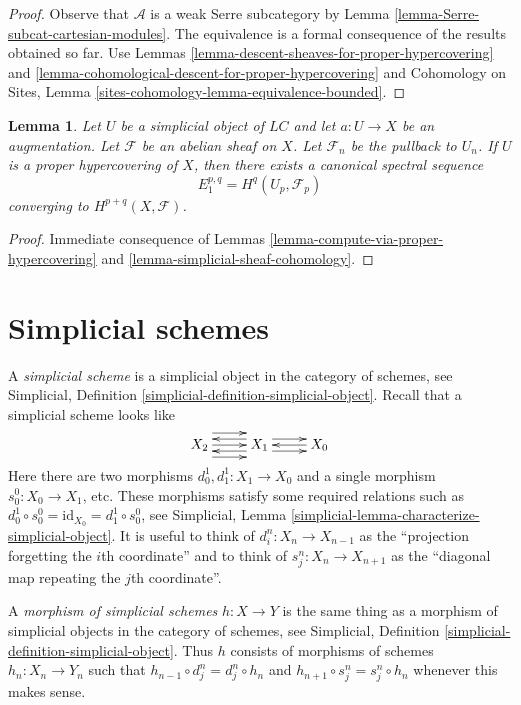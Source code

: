 \documentclass{stacks-project}
\theoremstyle{plain}
\newtheorem{lemma}[subsection]{Lemma}
\theoremstyle{definition}
\theoremstyle{remark}
\numberwithin{equation}{subsection}
\begin{document}
\begin{proof}
Observe that $\mathcal{A}$ is a weak Serre subcategory by
Lemma \ref{lemma-Serre-subcat-cartesian-modules}.
The equivalence is a
formal consequence of the results obtained so far. Use
Lemmas \ref{lemma-descent-sheaves-for-proper-hypercovering} and
\ref{lemma-cohomological-descent-for-proper-hypercovering} and
Cohomology on Sites, Lemma \ref{sites-cohomology-lemma-equivalence-bounded}.
\end{proof}

\begin{lemma}
\label{lemma-spectral-sequence-proper-hypercovering}
Let $U$ be a simplicial object of $\textit{LC}$ and let
$a : U \to X$ be an augmentation. Let $\mathcal{F}$ be an abelian sheaf
on $X$. Let $\mathcal{F}_n$ be the pullback to $U_n$.
If $U$ is a proper hypercovering of $X$, then
there exists a canonical spectral sequence
$$
E_1^{p, q} = H^q(U_p, \mathcal{F}_p)
$$
converging to $H^{p + q}(X, \mathcal{F})$.
\end{lemma}

\begin{proof}
Immediate consequence of Lemmas \ref{lemma-compute-via-proper-hypercovering}
and \ref{lemma-simplicial-sheaf-cohomology}.
\end{proof}




\section{Simplicial schemes}
\label{section-simplicial}

\noindent
A {\it simplicial scheme} is a simplicial object in the category of schemes,
see Simplicial, Definition \ref{simplicial-definition-simplicial-object}.
Recall that a simplicial scheme looks like
$$
\xymatrix{
X_2
\ar@<2ex>[r]
\ar@<0ex>[r]
\ar@<-2ex>[r]
&
X_1
\ar@<1ex>[r]
\ar@<-1ex>[r]
\ar@<1ex>[l]
\ar@<-1ex>[l]
&
X_0
\ar@<0ex>[l]
}
$$
Here there are two morphisms $d^1_0, d^1_1 : X_1 \to X_0$
and a single morphism $s^0_0 : X_0 \to X_1$, etc.
These morphisms satisfy some required relations such as
$d^1_0 \circ s^0_0 = \text{id}_{X_0} = d^1_1 \circ s^0_0$, see
Simplicial, Lemma \ref{simplicial-lemma-characterize-simplicial-object}.
It is useful to think of $d^n_i : X_n \to X_{n - 1}$
as the ``projection forgetting the $i$th coordinate'' and
to think of $s^n_j : X_n \to X_{n + 1}$ as the ``diagonal map repeating
the $j$th coordinate''.

\medskip\noindent
A {\it morphism of simplicial schemes} $h : X \to Y$ is the same
thing as a morphism of simplicial objects in the category of schemes,
see Simplicial, Definition \ref{simplicial-definition-simplicial-object}.
Thus $h$ consists of morphisms of schemes $h_n : X_n \to Y_n$
such that $h_{n - 1} \circ d^n_j = d^n_j \circ h_n$ and
$h_{n + 1} \circ s^n_j = s^n_j \circ h_n$ whenever this makes sense.
\end{document}
